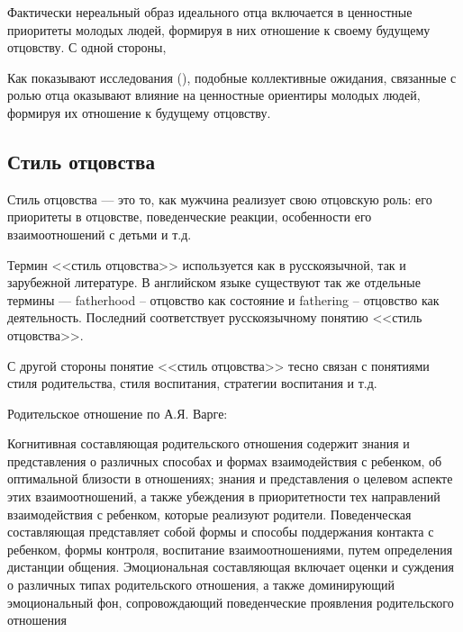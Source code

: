 \documentclass{../../common/thesisbyxetex}
\begin{document}
Фактически нереальный образ идеального отца включается в ценностные приоритеты молодых людей, 
формируя в них отношение к своему будущему отцовству. С одной стороны,
 
Как показывают исследования (\cite{imaf}), подобные коллективные ожидания, связанные с ролью отца 
оказывают влияние на ценностные ориентиры молодых людей, формируя их отношение к будущему 
отцовству. 







\subsection{Стиль отцовства}

Стиль отцовства --- это то, как мужчина реализует свою отцовскую роль: его приоритеты в отцовстве, 
поведенческие реакции, особенности его взаимоотношений с детьми и т.д.

Термин <<стиль отцовства>> используется как в русскоязычной, так и зарубежной литературе. В 
английском языке существуют так же отдельные термины --- fatherhood -- отцовство как 
состояние и fathering -- отцовство как деятельность. Последний соответствует русскоязычному понятию 
<<стиль отцовства>>.

С другой стороны понятие <<стиль отцовства>> тесно связан с понятиями стиля родительства, стиля 
воспитания, стратегии воспитания и т.д. 

Родительское отношение по А.Я. Варге:

Когнитивная составляющая родительского отношения содержит знания и
представления о различных способах и формах взаимодействия с ребенком, об
оптимальной близости в отношениях; знания и представления о целевом аспекте этих
взаимоотношений, а также убеждения в приоритетности тех направлений
взаимодействия с ребенком, которые реализуют родители.
Поведенческая составляющая представляет собой формы и способы поддержания
контакта с ребенком, формы контроля, воспитание взаимоотношениями, путем
определения дистанции общения.
Эмоциональная составляющая включает оценки и суждения о различных типах
родительского отношения, а также доминирующий эмоциональный фон,
сопровождающий поведенческие проявления родительского отношения \cite{varga}
\end{document}
